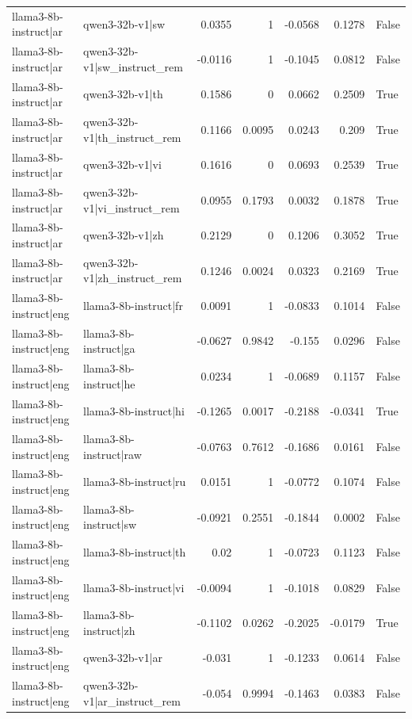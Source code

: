 \begin{table}
\begin{tabular}{l l r r r r l}
llama3-8b-instruct|ar & qwen3-32b-v1|sw & 0.0355 & 1 & -0.0568 & 0.1278 & False \\
llama3-8b-instruct|ar & qwen3-32b-v1|sw_instruct_rem & -0.0116 & 1 & -0.1045 & 0.0812 & False \\
llama3-8b-instruct|ar & qwen3-32b-v1|th & 0.1586 & 0 & 0.0662 & 0.2509 & True \\
llama3-8b-instruct|ar & qwen3-32b-v1|th_instruct_rem & 0.1166 & 0.0095 & 0.0243 & 0.209 & True \\
llama3-8b-instruct|ar & qwen3-32b-v1|vi & 0.1616 & 0 & 0.0693 & 0.2539 & True \\
llama3-8b-instruct|ar & qwen3-32b-v1|vi_instruct_rem & 0.0955 & 0.1793 & 0.0032 & 0.1878 & True \\
llama3-8b-instruct|ar & qwen3-32b-v1|zh & 0.2129 & 0 & 0.1206 & 0.3052 & True \\
llama3-8b-instruct|ar & qwen3-32b-v1|zh_instruct_rem & 0.1246 & 0.0024 & 0.0323 & 0.2169 & True \\
llama3-8b-instruct|eng & llama3-8b-instruct|fr & 0.0091 & 1 & -0.0833 & 0.1014 & False \\
llama3-8b-instruct|eng & llama3-8b-instruct|ga & -0.0627 & 0.9842 & -0.155 & 0.0296 & False \\
llama3-8b-instruct|eng & llama3-8b-instruct|he & 0.0234 & 1 & -0.0689 & 0.1157 & False \\
llama3-8b-instruct|eng & llama3-8b-instruct|hi & -0.1265 & 0.0017 & -0.2188 & -0.0341 & True \\
llama3-8b-instruct|eng & llama3-8b-instruct|raw & -0.0763 & 0.7612 & -0.1686 & 0.0161 & False \\
llama3-8b-instruct|eng & llama3-8b-instruct|ru & 0.0151 & 1 & -0.0772 & 0.1074 & False \\
llama3-8b-instruct|eng & llama3-8b-instruct|sw & -0.0921 & 0.2551 & -0.1844 & 0.0002 & False \\
llama3-8b-instruct|eng & llama3-8b-instruct|th & 0.02 & 1 & -0.0723 & 0.1123 & False \\
llama3-8b-instruct|eng & llama3-8b-instruct|vi & -0.0094 & 1 & -0.1018 & 0.0829 & False \\
llama3-8b-instruct|eng & llama3-8b-instruct|zh & -0.1102 & 0.0262 & -0.2025 & -0.0179 & True \\
llama3-8b-instruct|eng & qwen3-32b-v1|ar & -0.031 & 1 & -0.1233 & 0.0614 & False \\
llama3-8b-instruct|eng & qwen3-32b-v1|ar_instruct_rem & -0.054 & 0.9994 & -0.1463 & 0.0383 & False \\

\end{tabular}
\end{table}
